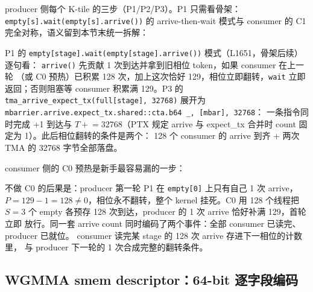 producer 侧每个 K-tile 的三步（P1/P2/P3）。P1 只需看骨架：
\texttt{empty[s].\allowbreak{}wait\allowbreak{}(empty[s].\allowbreak{}arrive\allowbreak{}())} 的 arrive-then-wait 模式与
consumer 的 C1 完全对称，语义留到本节末统一拆解：





P1 的 \texttt{empty[stage].\allowbreak{}wait\allowbreak{}(empty[stage].\allowbreak{}arrive\allowbreak{}())} 模式（L1651，骨架后续）
逐句看：
\texttt{arrive()} 先贡献 1 次到达并拿到旧相位 token，如果 consumer 在上一轮
（或 C0 预热）已积累 128 次，加上这次恰好 129，相位立即翻转，\texttt{wait} 立即
返回；否则阻塞等 consumer 积累满 129。P3 的
\texttt{tma\_\allowbreak{}arrive\_\allowbreak{}expect\_\allowbreak{}tx\allowbreak{}(full[stage],\allowbreak{} 32768)} 展开为
\texttt{mbarrier.\allowbreak{}arrive.\allowbreak{}expect\_\allowbreak{}tx.\allowbreak{}shared::\allowbreak{}cta.\allowbreak{}b64 \_\allowbreak{},\allowbreak{} [mbar],\allowbreak{} 32768}：
一条指令同时完成 +1 到达与 $T \mathrel{+}= 32768$（PTX 规定
arrive 与 expect\_tx 合并时 count 固定为 1）。此后相位翻转的条件是两个：
128 个 consumer 的 arrive 到齐 + 两次 TMA 的 32768 字节全部落盘。

consumer 侧的 C0 预热是新手最容易漏的一步：



不做 C0 的后果是：producer 第一轮 P1 在 \texttt{empty[0]} 上只有自己 1 次 arrive，
$P = 129 - 1 = 128 \ne 0$，相位永不翻转，整个 kernel 挂死。C0 用 128 个线程把
$S = 3$ 个 empty 各预存 128 次到达，producer 的 1 次 arrive 恰好补满 129，首轮立即
放行。同一套 arrive count 同时编码了两个事件：全部 consumer 已读完、producer 已就位。
consumer 读完某 stage 的 128 次 arrive 存进下一相位的计数里，
与 producer 下一轮的 1 次合成完整的翻转条件。

\subsection{WGMMA smem descriptor：64-bit 逐字段编码}

